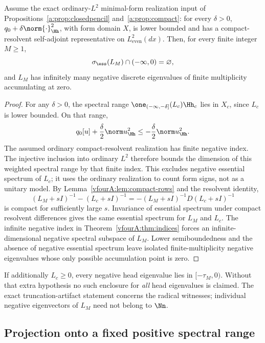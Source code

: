 \begin{theorem}
\label{vfourA:thm:negative-spectrum}
Assume the exact ordinary-$L^2$ minimal-form realization input of
Propositions~\ref{a:prop:closedpencil} and~\ref{a:prop:compact}:
for every $\delta>0$, $q_0+\delta\norm{\cdot}_{\Hh}^2$, with form
domain $X$, is lower bounded and has a compact-resolvent
self-adjoint representative on $L^2_{\mathrm{even}}(dx)$.
Then, for every finite integer $M\ge1$,
\[
 \sigma_{\ess}(L_M)\cap(-\infty,0)=\varnothing,
\]
and $L_M$ has infinitely many negative discrete eigenvalues of finite
multiplicity accumulating at zero.
\end{theorem}
\begin{proof}
For any $\delta>0$, the spectral range
$\one_{(-\infty,-\delta]}(L_c)\Hh_c$ lies in $X_c$, since $L_c$ is
lower bounded.  On that range,
\[
 q_0[u]+\frac\delta2\norm u_{\Hh}^2
 \le-\frac\delta2\norm u_{\Hh}^2.
\]
The assumed ordinary compact-resolvent realization has finite negative
index.  The injective inclusion into ordinary $L^2$ therefore bounds
the dimension of this weighted spectral range by that finite index.
This excludes negative essential spectrum of $L_c$; it uses the
ordinary realization to count form signs, not as a unitary model.
By Lemma~\ref{vfourA:lem:compact-rows} and the resolvent identity,
\[
 (L_M+sI)^{-1}-(L_c+sI)^{-1}
 =-(L_M+sI)^{-1}D(L_c+sI)^{-1}
\]
is compact for sufficiently large $s$.  Invariance of essential
spectrum under compact resolvent differences gives the same
essential spectrum for $L_M$ and $L_c$.
The infinite negative index in Theorem~\ref{vfourA:thm:indices}
forces an infinite-dimensional negative spectral subspace of $L_M$.
Lower semiboundedness and the absence of negative essential spectrum
leave isolated finite-multiplicity negative eigenvalues whose only
possible accumulation point is zero.
\end{proof}

If additionally $L_c\ge0$, every negative head eigenvalue lies in
$[-\tau_M,0)$.  Without that extra hypothesis no such enclosure for
\emph{all} head eigenvalues is claimed.  The exact truncation-artifact
statement concerns the radical witnesses; individual negative
eigenvectors of $L_M$ need not belong to $\Nn$.

\subsection{Projection onto a fixed positive spectral range}
\label{vfourA:subsec:projection}

